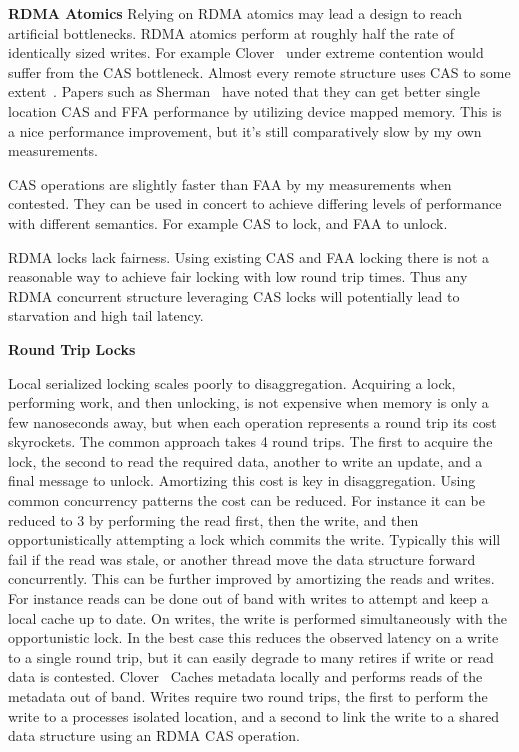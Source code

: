 \textbf{RDMA Atomics} Relying on RDMA atomics may lead a design to reach
artificial bottlenecks. RDMA atomics perform at roughly half the rate of
identically sized writes. For example Clover~\cite{clover} under extreme
contention would suffer from the CAS bottleneck. Almost every remote structure
uses CAS to some extent~. Papers such as
Sherman~\cite{sherman} have noted that they can get better single location CAS
and FFA performance by utilizing device mapped memory. This is a nice
performance improvement, but it's still comparatively slow by my own
measurements.

CAS operations are slightly faster than FAA by my measurements when contested.
They can be used in concert to achieve differing levels of performance with
different semantics. For example CAS to lock, and FAA to unlock.

RDMA locks lack fairness. Using existing CAS and FAA locking there is not a
reasonable way to achieve fair locking with low round trip times. Thus any RDMA
concurrent structure leveraging CAS locks will potentially lead to starvation
and high tail latency.

\textbf{Round Trip Locks}

Local serialized locking scales poorly to disaggregation. Acquiring a lock,
performing work, and then unlocking, is not expensive when memory is only a few
nanoseconds away, but when each operation represents a round trip its cost
skyrockets. The common approach takes 4 round trips. The first to acquire the
lock, the second to read the required data, another to write an update, and a
final message to unlock. Amortizing this cost is key in disaggregation. Using
common concurrency patterns the cost can be reduced. For instance it can be
reduced to 3 by performing the read first, then the write, and then
opportunistically attempting a lock which commits the write. Typically this will
fail if the read was stale, or another thread move the data structure forward
concurrently. This can be further improved by amortizing the reads and writes.
For instance reads can be done out of band with writes to attempt and keep a
local cache up to date. On writes, the write is performed simultaneously with
the opportunistic lock. In the best case this reduces the observed latency on a
write to a single round trip, but it can easily degrade to many retires if write
or read data is contested. Clover~\cite{clover} Caches metadata locally and
performs reads of the metadata out of band. Writes require two round trips, the
first to perform the write to a processes isolated location, and a second to
link the write to a shared data structure using an RDMA CAS operation.



